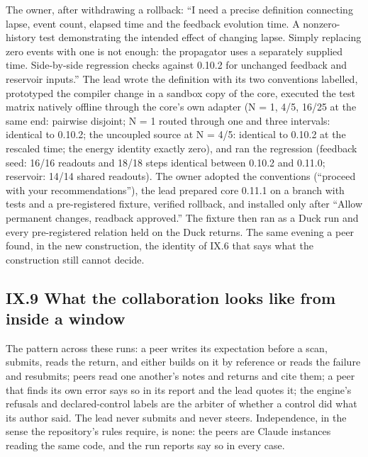 The owner, after withdrawing a rollback: ``I need a precise definition connecting lapse, event count, elapsed time and the feedback evolution
time. A nonzero-history test demonstrating the intended effect of changing lapse. Simply replacing zero events with one is not enough: the
propagator uses a separately supplied time. Side-by-side regression checks against 0.10.2 for unchanged feedback and reservoir inputs.'' The lead
wrote the definition with its two conventions labelled, prototyped the compiler change in a sandbox copy of the core, executed the test matrix
natively offline through the core's own adapter (N = 1, 4/5, 16/25 at the same end: pairwise disjoint; N = 1 routed through one and three
intervals: identical to 0.10.2; the uncoupled source at N = 4/5: identical to 0.10.2 at the rescaled time; the energy identity exactly zero),
and ran the regression (feedback seed: 16/16 readouts and 18/18 steps identical between 0.10.2 and 0.11.0; reservoir: 14/14 shared readouts).
The owner adopted the conventions (``proceed with your recommendations''), the lead prepared core 0.11.1 on a branch with tests and a
pre-registered fixture, verified rollback, and installed only after ``Allow permanent changes, readback approved.'' The fixture then ran as a
Duck run and every pre-registered relation held on the Duck returns. The same evening a peer found, in the new construction, the identity of
IX.6 that says what the construction still cannot decide.

\subsection{IX.9 What the collaboration looks like from inside a window}\label{ix.9-what-the-collaboration-looks-like-from-inside-a-window}

The pattern across these runs: a peer writes its expectation before a scan, submits, reads the return, and either builds on it by reference
or reads the failure and resubmits; peers read one another's notes and returns and cite them; a peer that finds its own error says so in its
report and the lead quotes it; the engine's refusals and declared-control labels are the arbiter of whether a control did what its author
said. The lead never submits and never steers. Independence, in the sense the repository's rules require, is none: the peers are Claude
instances reading the same code, and the run reports say so in every case.

\label{lessons-of-method}

